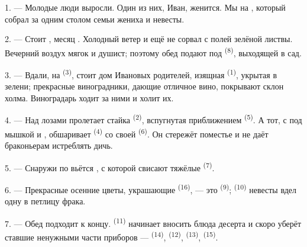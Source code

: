 
\VUsaut{4.0mm}
\VUsaut{1.6mm}
\VUsaut{3.2mm}

\VUsaut{1.6mm}
\VUsaut{2.6mm}

\VUsaut{3.0mm}

1. --- Молодые люди выросли. Один из них, Иван, женится. Мы на
, который собрал за одним столом семьи жениха и
невесты.

2. --- Стоит , месяц . Холодный ветер
 и  ещё не сорвал с полей зелёной листвы.
Вечерний воздух мягок и душист; поэтому обед подают под 
\textsuperscript{(8)}, выходящей в сад.

3. --- Вдали, на  \textsuperscript{(3)}, стоит дом Ивановых
родителей, изящная  \textsuperscript{(1)}, укрытая в зелени;
прекрасные виноградники, дающие отличное вино, покрывают склон холма.
Виноградарь ходит за ними и холит их.

4. --- Над лозами пролетает стайка  \textsuperscript{(2)},
вспугнутая приближением  \textsuperscript{(5)}. А тот, с
 под мышкой и , обшаривает
 \textsuperscript{(4)} со своей  \textsuperscript{(6)}.
Он стережёт поместье и не даёт браконьерам истреблять дичь.

5. --- Снаружи по  вьётся , с которой
свисают тяжёлые  \textsuperscript{(7)}.

6. --- Прекрасные осенние цветы, украшающие  \textsuperscript{(16)},
--- это  \textsuperscript{(9)};  \textsuperscript{(10)}
невесты вдел одну в петлицу фрака.

7. --- Обед подходит к концу.  \textsuperscript{(11)} начинает
вносить блюда десерта и скоро уберёт ставшие ненужными части приборов ---
 \textsuperscript{(14)},  \textsuperscript{(12)},
 \textsuperscript{(13)},  \textsuperscript{(15)}.

